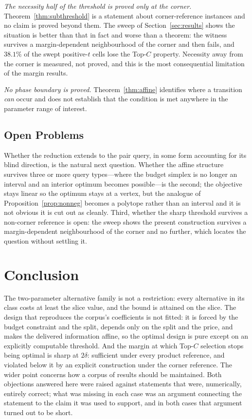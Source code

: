 \emph{The necessity half of the threshold is proved only at the corner.}
Theorem~\ref{thm:subthreshold} is a statement about corner-reference instances and no claim is
proved beyond them. The sweep of Section~\ref{sec:results} shows the situation is better than
that in fact and worse than a theorem: the witness survives a margin-dependent neighbourhood of
the corner and then fails, and $38.1\%$ of the swept positive-$t$ cells lose the Top-$C$
property. Necessity away from the corner is measured, not proved, and this is the most
consequential limitation of the margin results.

\emph{No phase boundary is proved.} Theorem~\ref{thm:affine} identifies where a transition
\emph{can} occur and does not establish that the condition is met anywhere in the parameter
range of interest.

\subsection{Open Problems}

Whether the reduction extends to the pair query, in some form accounting for its blind
direction, is the natural next question. Whether the affine structure survives three or more
query types---where the budget simplex is no longer an interval and an interior optimum
becomes possible---is the second; the objective stays linear so the optimum stays at a
vertex, but the analogue of Proposition~\ref{prop:nonneg} becomes a polytope rather than an
interval and it is not obvious it is cut out as cleanly. Third, whether the sharp threshold
survives a non-corner reference is open: the sweep shows the present construction survives a
margin-dependent neighbourhood of the corner and no further, which locates the question
without settling it.

\section{Conclusion}

The two-parameter alternative family is not a restriction: every alternative in its class
costs at least the slice value, and the bound is attained on the slice. The design
that reproduces the corpus's coefficients is not fitted: it is forced by the budget constraint
and the split, depends only on the split and the price, and makes the delivered information
affine, so the optimal design is pure except on an explicitly computable threshold. And the
margin at which Top-$C$ selection stops being optimal is sharp at $2\delta$: sufficient under
every product reference, and violated below it by an explicit construction under the corner
reference. The wider point concerns how a corpus of results should be maintained. Both
objections answered here were raised against statements that were, numerically, entirely
correct; what was missing in each case was an argument connecting the statement to the claim
it was used to support, and in both cases that argument turned out to be short.

